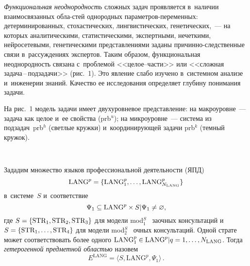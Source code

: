 \begin{multicols}{2}
  \textit{Функциональная неоднородность} сложных задач проявляется в~наличии 
взаимосвязанных обла-\linebreak стей однородных па\-ра\-мет\-ров-пе\-ре\-мен\-ных: детерминированных, 
стохастических, лингвистических, ге\-не\-ти\-че\-ских,~--- на которых аналитическими, 
статистическими, экспертными, нечеткими, нейросетевыми, генетическими представлениями 
заданы при\-чин\-но-след\-ст\-вен\-ные связи в~рассуждениях экспертов. Таким образом, 
функциональная неоднородность связана с~проблемой <<це\-лое--час\-ти>> или <<сложная 
за\-да\-ча\,--\,под\-за\-да\-чи>> (рис.~1). Это явление слабо изучено в~системном анализе 
и~инженерии знаний. Качество ее исследования определяет глубину понимания задачи. 
  
  На рис.~1 модель задачи имеет двухуровневое представление: на макроуровне~--- задача 
как целое и~ее свойства (prb$^u$); на микроуровне~--- система из подзадач~prb$^h$ (светлые 
кружки) и~координирующей задачи prb$^k$ (темный кружок). 
  
  \begin{figure*} %
  \vspace*{1pt}
 \begin{center}
 \mbox{%
 \epsfxsize=115.978mm
 }
 \end{center}
 \vspace*{-9pt}
\end{figure*}

  Зададим множество языков профессиональной деятельности (ЯПД) 
  $$
  \mathrm{LANG}^p\hm= \{ \mathrm{LANG}^p_1,\ldots , 
\mathrm{LANG}^p_{N_{\mathrm{LANG}}}\}
$$ 
в~системе~$S$ и~соответствие 
$$
\Psi_1\hm\subseteq \mathrm{LANG}^p \times {S}\vert \Psi_1\not= 
\varnothing,
$$
где 
${S}\hm= \{\mathrm{STR_1, STR_2, STR_3}\}$ для модели mod$_1^S$~\cite{11-kir, 17-kir} 
заочных консультаций и~${S}\hm= \{\mathrm{STR_1, \ldots, STR_4}\}$ для модели 
mod$_2^S$~\cite{11-kir, 17-kir} очных консультаций. Одной страте может соответствовать 
более одного $\mathrm{LANG}_1^p \hm\in \mathrm{LANG}^p \vert q \hm= 1,\ldots, 
N_{\mathrm{LANG}}$. Тогда \textit{гетерогенной предметной областью} назовем
  $$
  E^{\mathrm{LANG}} = \langle {S}, \mathrm{LANG}^p, \Psi_1\rangle\,.
  $$
  

\end{multicols}
